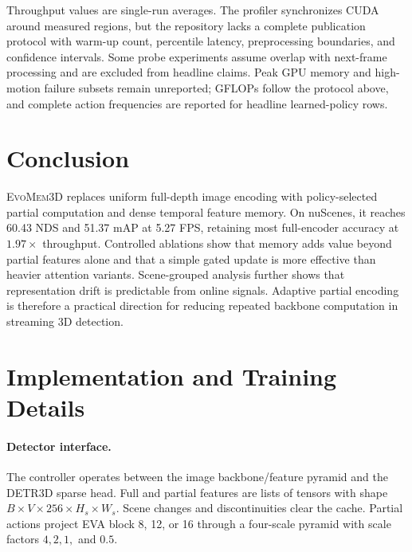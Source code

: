 \documentclass[10pt,twocolumn,letterpaper]{article}
\newcommand{\method}{\textsc{EvoMem3D}}
\begin{document}
Throughput values are single-run averages. The profiler synchronizes CUDA around measured regions, but the repository lacks a complete publication protocol with warm-up count, percentile latency, preprocessing boundaries, and confidence intervals. Some probe experiments assume overlap with next-frame processing and are excluded from headline claims. Peak GPU memory and high-motion failure subsets remain unreported; GFLOPs follow the protocol above, and complete action frequencies are reported for headline learned-policy rows.

\section{Conclusion}

\method{} replaces uniform full-depth image encoding with policy-selected partial computation and dense temporal feature memory. On nuScenes, it reaches 60.43 NDS and 51.37 mAP at 5.27 FPS, retaining most full-encoder accuracy at $1.97\times$ throughput. Controlled ablations show that memory adds value beyond partial features alone and that a simple gated update is more effective than heavier attention variants. Scene-grouped analysis further shows that representation drift is predictable from online signals. Adaptive partial encoding is therefore a practical direction for reducing repeated backbone computation in streaming 3D detection.


\newpage

{\small


}


\newpage

\appendix

\section{Implementation and Training Details}
\label{app:implementation}

\paragraph{Detector interface.}
The controller operates between the image backbone/feature pyramid and the DETR3D sparse head. Full and partial features are lists of tensors with shape $B\times V\times256\times H_s\times W_s$. Scene changes and discontinuities clear the cache. Partial actions project EVA block 8, 12, or 16 through a four-scale pyramid with scale factors $4,2,1,$ and $0.5$.
\end{document}
